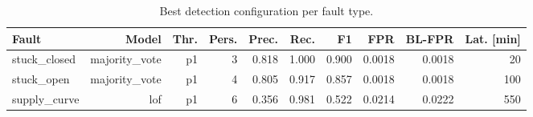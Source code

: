 \begin{table}[htbp]
  \centering
  \caption{Best detection configuration per fault type.}
  \label{tab:detection_best}
  \begin{tabular}{lrrrrrrrrr}
    \toprule
    Fault & Model & Thr. & Pers. & Prec. & Rec. & F1 & FPR & BL-FPR & Lat. [min] \\
    \midrule
    stuck\_closed & majority\_vote & p1 & 3 & 0.818 & 1.000 & 0.900 & 0.0018 & 0.0018 & 20 \\
    stuck\_open & majority\_vote & p1 & 4 & 0.805 & 0.917 & 0.857 & 0.0018 & 0.0018 & 100 \\
    supply\_curve & lof & p1 & 6 & 0.356 & 0.981 & 0.522 & 0.0214 & 0.0222 & 550 \\
    \bottomrule
  \end{tabular}
\end{table}